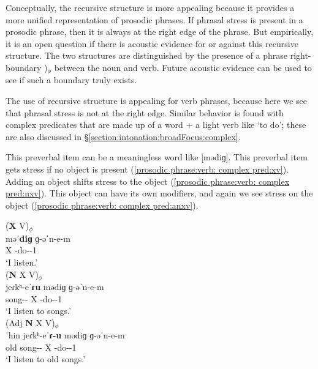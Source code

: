 Conceptually, the recursive structure is more appealing because it provides a more unified representation of prosodic phrases. If phrasal stress is present in a prosodic phrase, then it is always at the right edge of the phrase. But empirically, it is an open question if there is acoustic evidence for or against this recursive structure. The two structures are distinguished by the presence of a phrase right-boundary )$_\phi$ between the noun and verb. Future acoustic evidence can be used to see if such a boundary truly exists. 


The use of recursive structure is appealing for       verb phrases, because here we see that phrasal stress is not at the right edge. Similar behavior is found with  complex predicates that are   made up of a word +  a light verb like `to do'; these are also discussed in \S\ref{section:intonation:broadFocus:complex}. 

This preverbal item can be a meaningless word like [mədiɡ]. This preverbal item gets stress if no object is present (\ref{prosodic phrase:verb: complex pred:xv}). Adding an object shifts stress to the object (\ref{prosodic phrase:verb: complex pred:nxv}). This object can have its own modifiers, and again we see stress on the object (\ref{prosodic phrase:verb: complex pred:anxv}). 


\begin{exe}
	\ex 
	\begin{xlist}
		\ex \glll (\textbf{X} V)$_\phi$ \\
		məˈ\textbf{diɡ} ɡ-əˈn-e-m\\ 
		X  {\ind}-do-{\thgloss}-1{\sg} \\
		\trans `I listen.' \label{prosodic phrase:verb: complex pred:xv}\\ 
		\ex \glll (\textbf{N} X V)$_\phi$ \\
		jeɾkʰ-e\textbf{ˈɾu} mə{diɡ} ɡ-əˈn-e-m\\ 
		song-{\pl}-{\dat} X  {\ind}-do-{\thgloss}-1{\sg} \\
		\trans `I listen to songs.'\label{prosodic phrase:verb: complex pred:nxv} \\ 
		\ex \glll (Adj \textbf{N} X V)$_\phi$ \\
		ˈhin jeɾkʰ-eˈ\textbf{ɾ-u} mə{diɡ} ɡ-əˈn-e-m\\ 
		old song-{\pl}-{\dat} X  {\ind}-do-{\thgloss}-1{\sg} \\
		\trans `I listen to old songs.' \label{prosodic phrase:verb: complex pred:anxv}\\ 
\end{xlist}\end{exe}

